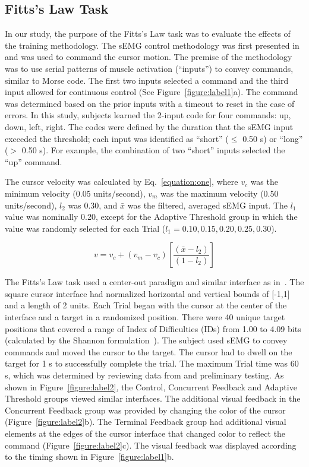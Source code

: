 \begin{mdframed}[hidealllines=true,backgroundcolor=blue!20]
	\subsection{Fitts's Law Task}
	In our study, the purpose of the Fitts's Law task was to evaluate the effects of the training methodology.
	The sEMG control methodology was first presented in~\citep{RN45} and was used to command the cursor motion.
	The premise of the methodology was to use serial patterns of muscle activation (``inputs'') to convey commands, similar to Morse code.
	The first two inputs selected a command and the third input allowed for continuous control (See Figure~\ref{figure:label1}a).
	The command was determined based on the prior inputs with a timeout to reset in the case of errors.
	In this study, subjects learned the 2-input code for four commands: up, down, left, right.
	The codes were defined by the duration that the sEMG input exceeded the threshold; each input was identified as ``short'' ($\leq$ 0.50 s) or ``long'' ($>$ 0.50 s).
	For example, the combination of two ``short'' inputs selected the ``up'' command.

	The cursor velocity was calculated by Eq.~\ref{equation:one}, where $v_c$ was the minimum velocity (0.05 units/second), $v_m$ was the maximum velocity (0.50 units/second), $l_2$ was 0.30, and $\bar{x}$ was the filtered, averaged sEMG input.
	The $l_1$ value was nominally 0.20, except for the Adaptive Threshold group in which the value was randomly selected for each Trial ($l_1 = 0.10, 0.15, 0.20, 0.25, 0.30$).

	\begin{equation}
		\label{equation:one}
		v= v_c+\left(v_m-v_c\right)\left[\frac{\left(\bar{x}-l_2\right)}{\left(1-l_2\right)}\right]
	\end{equation}

	The Fitts's Law task used a center-out paradigm and similar interface as in~\citep{RN45}.
	The square cursor interface had normalized horizontal and vertical bounds of [-1,1] and a length of 2 units.
	Each Trial began with the cursor at the center of the interface and a target in a randomized position.
	There were 40 unique target positions that covered a range of Index of Difficulties (IDs) from 1.00 to 4.09 bits (calculated by the Shannon formulation~\citep{RN50}).
	The subject used sEMG to convey commands and moved the cursor to the target.
	The cursor had to dwell on the target for 1 s to successfully complete the trial.
	The maximum Trial time was 60 s, which was determined by reviewing data from \citet{RN45} and preliminary testing.
	As shown in Figure~\ref{figure:label2}, the Control, Concurrent Feedback and Adaptive Threshold groups viewed similar interfaces.
	The additional visual feedback in the Concurrent Feedback group was provided by changing the color of the cursor (Figure~\ref{figure:label2}b).
	The Terminal Feedback group had additional visual elements at the edges of the cursor interface that changed color to reflect the command (Figure~\ref{figure:label2}c).
	The visual feedback was displayed according to the timing shown in Figure~\ref{figure:label1}b.
\end{mdframed}

